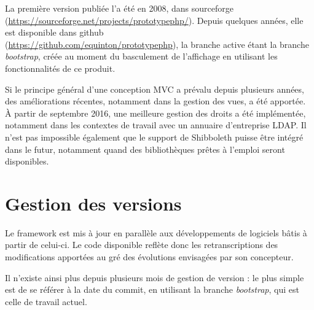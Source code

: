 La première version publiée l'a été en 2008, dans sourceforge \\ (\url{https://sourceforge.net/projects/prototypephp/}). Depuis quelques années, elle est disponible dans github \\(\url{https://github.com/equinton/prototypephp}), la branche active étant la branche \textit{bootstrap}, créée au moment du basculement de l'affichage en utilisant les fonctionnalités de ce produit.

Si le principe général d'une conception MVC a prévalu depuis plusieurs années, des améliorations récentes, notamment dans la gestion des vues, a été apportée. À partir de septembre 2016, une meilleure gestion des droits a été implémentée, notamment dans les contextes de travail avec un annuaire d'entreprise LDAP. 
Il n'est pas impossible également que le support de Shibboleth puisse être intégré dans le futur, notamment quand des bibliothèques prêtes à l'emploi seront disponibles.

\section*{Gestion des versions}

Le framework est mis à jour en parallèle aux développements de logiciels bâtis à partir de celui-ci. Le code disponible reflète donc les retranscriptions des modifications apportées au gré des évolutions envisagées par son concepteur.

Il n'existe ainsi plus depuis plusieurs mois de gestion de version : le plus simple est de se référer à la date du commit, en utilisant la branche \textit{bootstrap}, qui est celle de travail actuel.


